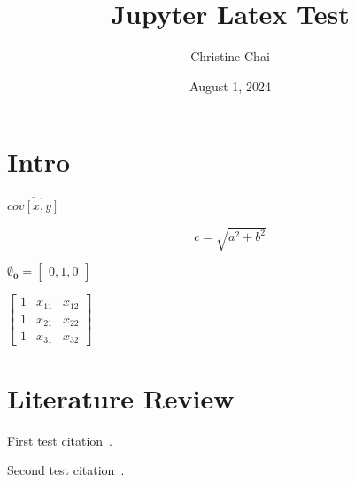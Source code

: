 \documentclass{article}
\title{Jupyter Latex Test}
\author{Christine Chai}
\date{August 1, 2024}
\begin{document}
\maketitle

\section{Intro}

$\hat{cov[x,y]}$

$$c = \sqrt{a^2 + b^2}$$

\(\mathbf{\emptyset_0} =\begin{bmatrix}0,1,0\end{bmatrix}\)

$\begin{bmatrix} 1 & x_{11} & x_{12}\\ 1 & x_{21} & x_{22} \\ 1 & x_{31} & x_{32} \end{bmatrix}$

\section{Literature Review}

First test citation~\cite{gharehchopogh2011analysis}.

Second test citation~\cite{kalra2018importance}.



\end{document}
